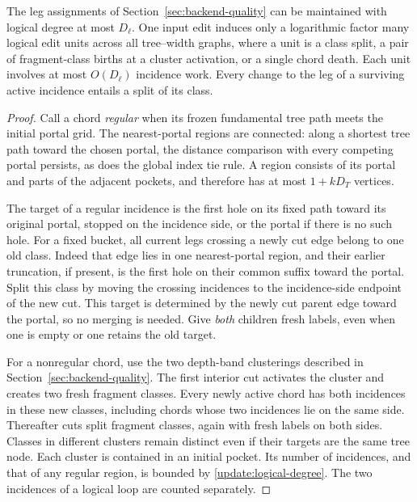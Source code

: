 \begin{lemma}
\label{update:classes}
The leg assignments of Section~\ref{sec:backend-quality} can be maintained
with logical degree at most $D_\ell$.  One input edit induces only a
logarithmic factor many logical edit units across all tree--width
graphs, where a unit is a class split, a pair of fragment-class births
at a cluster activation, or a single chord death.  Each unit involves
at most $O(D_\ell)$ incidence work.  Every change to the leg of a
surviving active incidence entails a split of its class.
\end{lemma}

\begin{proof}
Call a chord \emph{regular} when its frozen fundamental tree path meets
the initial portal grid.  The nearest-portal regions are connected:
along a shortest tree path toward the chosen portal, the distance
comparison with every competing portal persists, as does the global
index tie rule.  A region consists of its portal and parts of the
adjacent pockets, and therefore has at most $1+kD_T$ vertices.

The target of a regular incidence is the first hole on its fixed path
toward its original portal, stopped on the incidence side, or the portal
if there is no such hole.  For a fixed bucket, all current legs crossing
a newly cut edge belong to one old class.  Indeed that edge lies in one
nearest-portal region, and their earlier truncation, if present, is the
first hole on their common suffix toward the portal.  Split this class
by moving the crossing incidences to the incidence-side endpoint of the
new cut.  This target is determined by the newly cut parent edge toward
the portal, so no merging is needed.  Give \emph{both} children fresh
labels, even when one is empty or one retains the old target.

For a nonregular chord, use the two depth-band clusterings described in
Section~\ref{sec:backend-quality}.  The first interior cut activates the
cluster and creates two fresh fragment classes.  Every newly active
chord has both incidences in these new classes, including chords whose
two incidences lie on the same side.  Thereafter cuts split fragment
classes, again with fresh labels on both sides.  Classes in different
clusters remain distinct even if their targets are the same tree node.
Each cluster is contained in an initial pocket.  Its number of
incidences, and that of any regular region, is bounded by
\eqref{update:logical-degree}.  The two incidences of a logical loop are
counted separately.


\end{proof}
